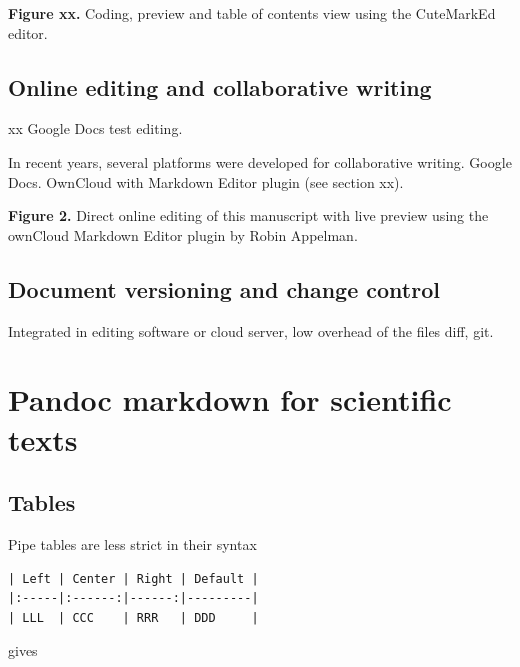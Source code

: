 \documentclass[10pt,fleq]{wlpeerj}
\begin{document}
\textbf{Figure
xx.}
Coding,
preview
and table
of
contents
view using
the
CuteMarkEd
editor.

\subsection{Online
editing
and
collaborative
writing}\label{online-editing-and-collaborative-writing}

xx Google
Docs test
editing.

In recent
years,
several
platforms
were
developed
for
collaborative
writing.
Google
Docs.
OwnCloud
with
Markdown
Editor
plugin
(see
section
xx).

\textbf{Figure
2.} Direct
online
editing of
this
manuscript
with live
preview
using the
ownCloud
Markdown
Editor
plugin by
Robin
Appelman.

\subsection{Document
versioning
and change
control}\label{document-versioning-and-change-control}

Integrated
in editing
software
or cloud
server,
low
overhead
of the
files
diff, git.

\section{Pandoc
markdown
for
scientific
texts}\label{pandoc-markdown-for-scientific-texts}

\subsection{Tables}\label{tables}

Pipe
tables are
less
strict in
their
syntax

\begin{verbatim}
| Left | Center | Right | Default |
|:-----|:------:|------:|---------|
| LLL  | CCC    | RRR   | DDD     |
\end{verbatim}

gives
\end{document}
